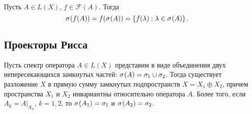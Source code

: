 \begin{theorem}\hfill\\
    \indent Пусть $A \in L(X)$, $f \in \mathcal F(A)$. Тогда
    \[ \spectrum{f(A)} = f(\spectrum{A}) = \menge{f(\lambda) : \lambda \in \spectrum{A}}. \]
\end{theorem}

\subsection{Проекторы Рисса}
\begin{theorem}
Пусть спектр оператора $A \in L(X)$ представим в виде объединения двух непересекающихся
замкнутых частей: $\spectrum{A} = \sigma_1 \cup \sigma_2$. Тогда существует разложение $X$
в прямую сумму замкнутых подпространств $X = X_1 \oplus X_2$, причем пространства $X_1$ и $X_2$ 
инвариантны относительно оператора $A$. Более того, если $A_k = A|_{X_k}$, $k=1,2$, то $\spectrum{A_1} = \sigma_1$ и
$\spectrum{A_2} = \sigma_2$.
\end{theorem}

